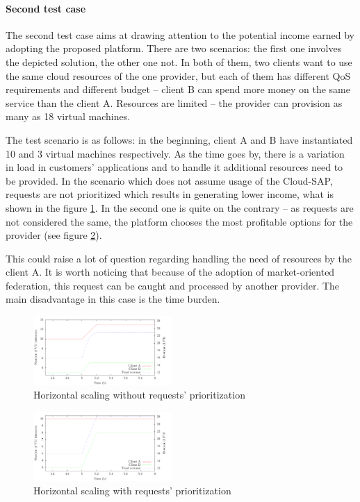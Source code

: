 \documentclass[twocolumn]{svjour3}          %
\begin{document}
\paragraph{Second test case}
The second test case aims at drawing attention to the potential income earned by adopting the proposed platform. There are two scenarios: the first one involves the depicted solution, the other one not. In both of them, two clients want to use the same cloud resources of the one provider, but each of them has different QoS requirements and different budget -- client B can spend more money on the same service than the client A. Resources are limited -- the provider can provision as many as 18 virtual machines.

The test scenario is as follows: in the beginning, client A and B have instantiated 10 and 3 virtual machines respectively. As the time goes by, there is a variation in load in customers' applications and to handle it additional resources need to be provided. In the scenario which does not assume usage of the Cloud-SAP, requests are not prioritized which results in generating lower income, what is shown in the figure \ref{fig:hor-scaling-no-prioritization}. In the second one is quite on the contrary -- as requests are not considered the same, the platform chooses the most profitable options for the provider (see figure \ref{fig:hor-scaling-with-prioritization}).

This could raise a lot of question regarding handling the need of resources by the client A. It is worth noticing that because of the adoption of market-oriented federation, this request can be caught and processed by another provider. The main disadvantage in this case is the time burden.

\begin{figure}
  \includegraphics[width=0.47\textwidth]{figures/request-priority-revenue-1}
\caption{Horizontal scaling without  requests' prioritization}
\label{fig:hor-scaling-no-prioritization}       %
\end{figure}

\begin{figure}
  \includegraphics[width=0.47\textwidth]{figures/request-priority-revenue-2}
\caption{Horizontal scaling with requests' prioritization}
\label{fig:hor-scaling-with-prioritization}       %
\end{figure}
\end{document}
